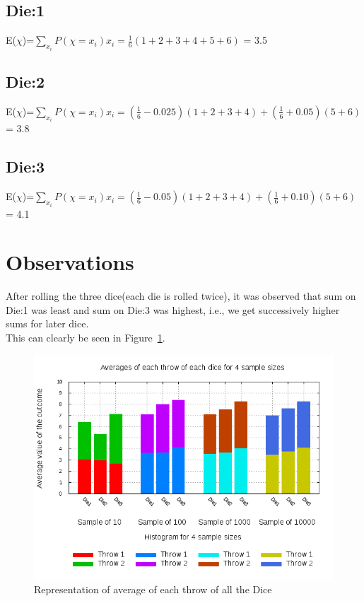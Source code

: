 \documentclass[a4paper, 12pt]{article}
\begin{document}
\subsection{Die:1}
E($\chi$)=$\sum_{x_{i}}P(\chi = x_{i})x_{i} = \frac{1}{6}(1+2+3+4+5+6)$ = 3.5

\subsection{Die:2}
E($\chi$)=$\sum_{x_{i}}P(\chi = x_{i})x_{i} = (\frac{1}{6}-0.025)(1+2+3+4) + (\frac{1}{6}+0.05)(5+6)$ = 3.8

\subsection{Die:3}
E($\chi$)=$\sum_{x_{i}}P(\chi = x_{i})x_{i} = (\frac{1}{6}-0.05)(1+2+3+4) + (\frac{1}{6}+0.10)(5+6)$ = 4.1

\newpage

\section{Observations}
After rolling the three dice(each die is rolled twice), it was observed that sum on Die:1 was least and sum on Die:3 was highest, i.e., we get successively higher sums for later dice.\\
This can clearly be seen in Figure~\ref{fig:figure1}.

\begin{figure}[ht]\centering
\includegraphics[width=1\columnwidth]
{output2.png}
\caption{Representation of average of each throw of all the Dice}
\label{fig:figure1}
\end{figure}
\end{document}
